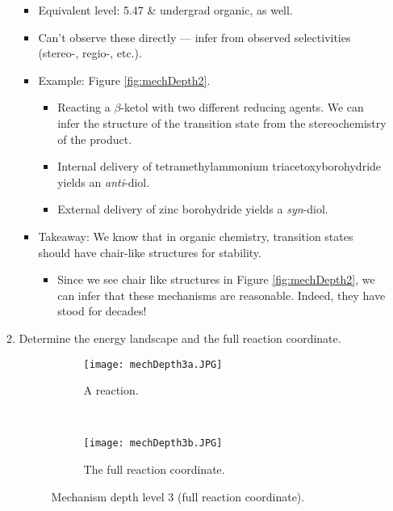 \documentclass[../notes.tex]{subfiles}
\begin{document}
\begin{itemize}
\begin{enumerate}
\begin{itemize}
            \item Equivalent level: 5.47 \& undergrad organic, as well.
            \item Can't observe these directly --- infer from observed selectivities (stereo-, regio-, etc.).
            \item Example: Figure \ref{fig:mechDepth2}.
            \begin{itemize}
                \item Reacting a $\beta$-ketol with two different reducing agents. We can infer the structure of the transition state from the stereochemistry of the product.
                \item Internal delivery of tetramethylammonium triacetoxyborohydride yields an \emph{anti}-diol.
                \item External delivery of zinc borohydride yields a \emph{syn}-diol.
            \end{itemize}
            \item Takeaway: We know that in organic chemistry, transition states should have chair-like structures for stability.
            \begin{itemize}
                \item Since we see chair like structures in Figure \ref{fig:mechDepth2}, we can infer that these mechanisms are reasonable. Indeed, they have stood for decades!
            \end{itemize}
        \end{itemize}
        \item Determine the energy landscape and the full reaction coordinate.
        \begin{figure}[h!]
            \centering
            \begin{subfigure}[b]{\linewidth}
                \centering
                \texttt{[image: mechDepth3a.JPG]}
                \caption{A reaction.}
                \label{fig:mechDepth3a}
            \end{subfigure}\\[1em]
            \begin{subfigure}[b]{\linewidth}
                \centering
                \texttt{[image: mechDepth3b.JPG]}
                \caption{The full reaction coordinate.}
                \label{fig:mechDepth3b}
            \end{subfigure}
            \caption{Mechanism depth level 3 (full reaction coordinate).}
            \label{fig:mechDepth3}

\end{figure}
\end{enumerate}
\end{itemize}
\end{document}
